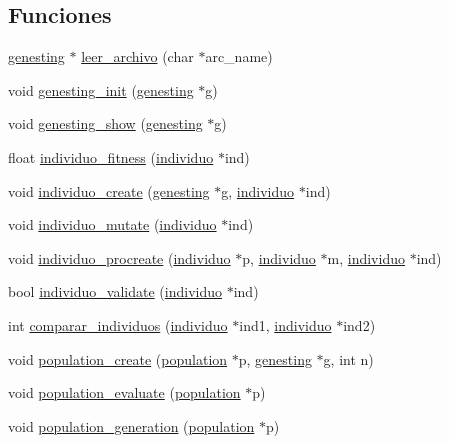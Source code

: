 \subsection*{Funciones}
\begin{CompactItemize}
\item 
\hyperlink{struct__genesting}{genesting} $\ast$ \hyperlink{group__genetic_g6fed4910dd1f6172bb5a4e35a97bbe56_g6fed4910dd1f6172bb5a4e35a97bbe56}{leer\_\-archivo} (char $\ast$arc\_\-name)
\item 
void \hyperlink{group__genetic_g1daa6a4e8af34b8b16a48fc2f3701f1c_g1daa6a4e8af34b8b16a48fc2f3701f1c}{genesting\_\-init} (\hyperlink{struct__genesting}{genesting} $\ast$g)
\item 
void \hyperlink{group__genetic_g3f63f4034274d731cb3fdf3200c64d41_g3f63f4034274d731cb3fdf3200c64d41}{genesting\_\-show} (\hyperlink{struct__genesting}{genesting} $\ast$g)
\item 
float \hyperlink{group__genetic_gf152bd4602acec2166cc4b91e8c8919a_gf152bd4602acec2166cc4b91e8c8919a}{individuo\_\-fitness} (\hyperlink{struct__individuo}{individuo} $\ast$ind)
\item 
void \hyperlink{group__genetic_gf4e60223d27c85a5f6166e35ecafe641_gf4e60223d27c85a5f6166e35ecafe641}{individuo\_\-create} (\hyperlink{struct__genesting}{genesting} $\ast$g, \hyperlink{struct__individuo}{individuo} $\ast$ind)
\item 
void \hyperlink{group__genetic_g05b6d3d7a4be17c9cbf479f424edd01b_g05b6d3d7a4be17c9cbf479f424edd01b}{individuo\_\-mutate} (\hyperlink{struct__individuo}{individuo} $\ast$ind)
\item 
void \hyperlink{group__genetic_g18105662f4835e24cf3b8fc40ed63b33_g18105662f4835e24cf3b8fc40ed63b33}{individuo\_\-procreate} (\hyperlink{struct__individuo}{individuo} $\ast$p, \hyperlink{struct__individuo}{individuo} $\ast$m, \hyperlink{struct__individuo}{individuo} $\ast$ind)
\item 
bool \hyperlink{group__genetic_gf80cc38ea4d590f6c45215f770d63778_gf80cc38ea4d590f6c45215f770d63778}{individuo\_\-validate} (\hyperlink{struct__individuo}{individuo} $\ast$ind)
\item 
int \hyperlink{group__genetic_gd9507b892f115e76cd4162059839370c_gd9507b892f115e76cd4162059839370c}{comparar\_\-individuos} (\hyperlink{struct__individuo}{individuo} $\ast$ind1, \hyperlink{struct__individuo}{individuo} $\ast$ind2)
\item 
void \hyperlink{group__genetic_gc7ba874876f18abab66f0a42f32b98cc_gc7ba874876f18abab66f0a42f32b98cc}{population\_\-create} (\hyperlink{struct__population}{population} $\ast$p, \hyperlink{struct__genesting}{genesting} $\ast$g, int n)
\item 
void \hyperlink{group__genetic_g229293c432c5ef4f70b1ee94c109bb1a_g229293c432c5ef4f70b1ee94c109bb1a}{population\_\-evaluate} (\hyperlink{struct__population}{population} $\ast$p)
\item 
void \hyperlink{group__genetic_g5b3202f02e14d7fb3eb1f729d1250243_g5b3202f02e14d7fb3eb1f729d1250243}{population\_\-generation} (\hyperlink{struct__population}{population} $\ast$p)
\end{CompactItemize}


